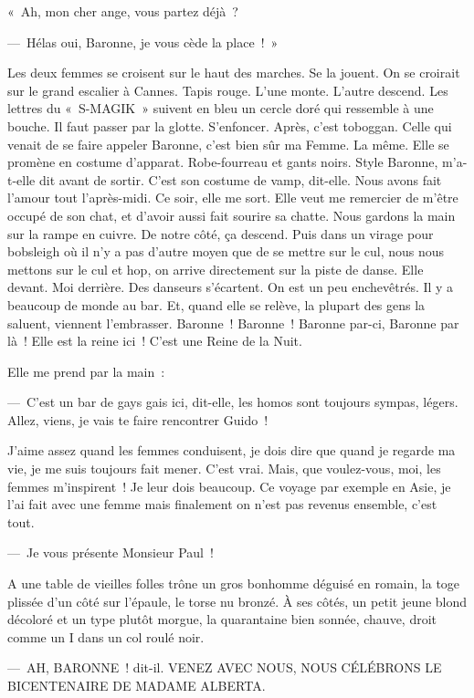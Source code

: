 \documentclass[twoside]{book} %
\begin{document}
\noindent « Ah, mon cher ange, vous partez déjà ?\par
— Hélas oui, Baronne, je vous cède la place ! »\par
Les deux femmes se croisent sur le haut des marches. Se la jouent. On se croirait sur le grand escalier à Cannes. Tapis rouge. L’une monte. L’autre descend. Les lettres du « S-MAGIK » suivent en bleu un cercle doré qui ressemble à une bouche. Il faut passer par la glotte. S’enfoncer. Après, c’est toboggan. Celle qui venait de se faire appeler Baronne, c’est bien sûr ma Femme. La même. Elle se promène en costume d’apparat. Robe-fourreau et gants noirs. Style Baronne, m’a-t-elle dit avant de sortir. C’est son costume de vamp, dit-elle. Nous avons fait l’amour tout l’après-midi. Ce soir, elle me sort. Elle veut me remercier de m’être occupé de son chat, et d’avoir aussi fait sourire sa chatte. Nous gardons la main sur la rampe en cuivre. De notre côté, ça descend. Puis dans un virage pour bobsleigh où il n’y a pas d’autre moyen que de se mettre sur le cul, nous nous mettons sur le cul et hop, on arrive directement sur la piste de danse. Elle devant. Moi derrière. Des danseurs s’écartent. On est un peu enchevêtrés. Il y a beaucoup de monde au bar. Et, quand elle se relève, la plupart des gens la saluent, viennent l’embrasser. Baronne ! Baronne ! Baronne par-ci, Baronne par là ! Elle est la reine ici ! C’est une Reine de la Nuit.\par
Elle me prend par la main :\par
— C’est un bar de gays gais ici, dit-elle, les homos sont toujours sympas, légers. Allez, viens, je vais te faire rencontrer Guido !\par
J’aime assez quand les femmes conduisent, je dois dire que quand je regarde ma vie, je me suis toujours fait mener. C’est vrai. Mais, que voulez-vous, moi, les femmes m’inspirent ! Je leur dois beaucoup. Ce voyage par exemple en Asie, je l’ai fait avec une femme mais finalement on n’est pas revenus ensemble, c’est tout.\par
— Je vous présente Monsieur Paul !\par
A une table de vieilles folles trône un gros bonhomme déguisé en romain, la toge plissée d’un côté sur l’épaule, le torse nu bronzé. À ses côtés, un petit jeune blond décoloré et un type plutôt morgue, la quarantaine bien sonnée, chauve, droit comme un I dans un col roulé noir.\par
— AH, BARONNE ! dit-il. VENEZ AVEC NOUS, NOUS CÉLÉBRONS LE BICENTENAIRE DE MADAME ALBERTA.\par
\end{document}
